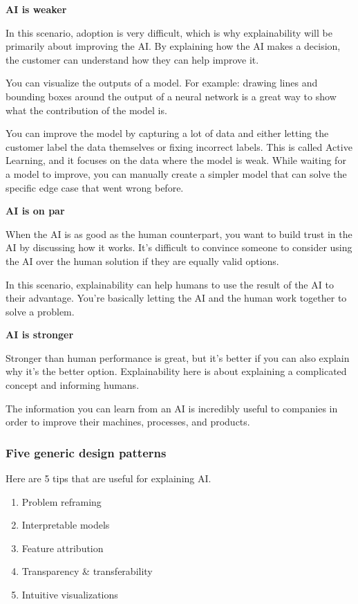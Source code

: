 \documentclass{article}
\begin{document}
\textbf{AI is weaker}

In this scenario, adoption is very difficult, which is why explainability
will be primarily about improving the AI. By explaining how the AI makes a decision,
the customer can understand how they can help improve it. 

You can visualize the outputs of a model. For example: drawing lines and bounding 
boxes around the output of a neural network is a great way to show what the 
contribution of the model is.

You can improve the model by capturing a lot of data and either letting the customer label
the data themselves or fixing incorrect labels. This is called Active Learning, and it
focuses on the data where the model is weak. 
While waiting for a model to improve, you can manually create a simpler model that can
solve the specific edge case that went wrong before.

\textbf{AI is on par}

When the AI is as good as the human counterpart, you want to build trust in the
AI by discussing how it works. It's difficult to convince someone to consider 
using the AI over the human solution if they are equally valid options. 

In this scenario, explainability can help humans to use the result of the AI 
to their advantage. You're basically letting the AI and the human work together
to solve a problem.


\textbf{AI is stronger}

Stronger than human performance is great, but it's better if you can also explain
why it's the better option. Explainability here is about explaining a complicated
concept and informing humans.

The information you can learn from an AI is incredibly useful to companies in order
to improve their machines, processes, and products. 

\subsubsection{Five generic design patterns}

Here are 5 tips that are useful for explaining AI.

\begin{enumerate}
    \item Problem reframing
    \item Interpretable models
    \item Feature attribution
    \item Transparency \& transferability
    \item Intuitive visualizations
\end{enumerate}
\end{document}
